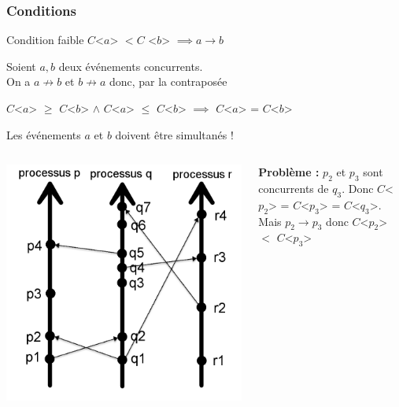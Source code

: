 \documentclass[compress]{beamer}
\begin{document}
\begin{frame}
\frametitle{Conditions}
\begin{block}{Condition faible}
$C$<$a$> $ < C$ <$b$> $\implies a \rightarrow b$
\end{block}
\bigskip
Soient $a, b$ deux événements concurrents. \\On a $a \not\rightarrow b$  et $b \not\rightarrow a$ donc, par la contraposée\\
\begin{center}
$C$<$a$>  $\geq$ $C$<$b$> $\land$ $C$<$a$>  $\leq$ $C$<$b$>  $\implies$ $C$<$a$> = $C$<$b$>
\end{center}
Les événements $a$ et $b$ doivent être simultanés !
\end{frame}
\begin{frame}

\begin{columns}
    \begin{column}{.35\textwidth}
		\includegraphics[scale=0.15]{process2.png}
    \end{column}
	\begin{column}{0.65 \textwidth}
\textbf{{\color{red}Problème : }}$p_2$ et $p_3$ sont concurrents de $q_3$. Donc $C$<$p_2$> = $C$<$p_3$> = $C$<$q_3$>. \\
Mais $p_2 \rightarrow p_3$ donc $C$<$p_2$> $<$ $C$<$p_3$>\\ \bigskip

\end{column}
\end{columns}
\end{frame}
\end{document}
